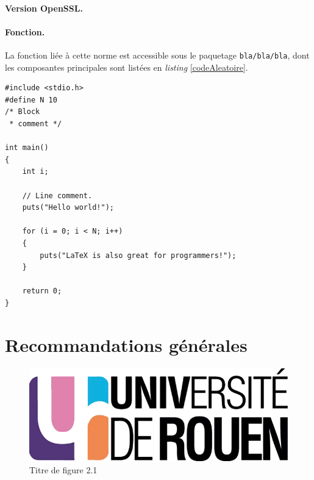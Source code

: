			\paragraph{Version OpenSSL.\\}
			
			\paragraph{Fonction.\\}
			La fonction liée à cette norme est accessible sous le paquetage
			\texttt{bla/bla/bla}, dont les composantes principales sont 
			listées en \textit{listing} \ref{codeAleatoire}.
		
		
		\begin{lstlisting}[style=customc,caption=codeAleatoire.c, label=codeAleatoire]
#include <stdio.h>
#define N 10
/* Block
 * comment */
 
int main()
{
    int i;
 
    // Line comment.
    puts("Hello world!");
 
    for (i = 0; i < N; i++)
    {
        puts("LaTeX is also great for programmers!");
    }
 
    return 0;
}
		\end{lstlisting}
		
		
		
		
		
	

\section{Recommandations générales}




\begin{figure}[H]
	\centering
	\includegraphics[scale=0.2]{images/logo_univ.png}
	\caption{Titre de figure 2.1}
	\label{fig21}
\end{figure}